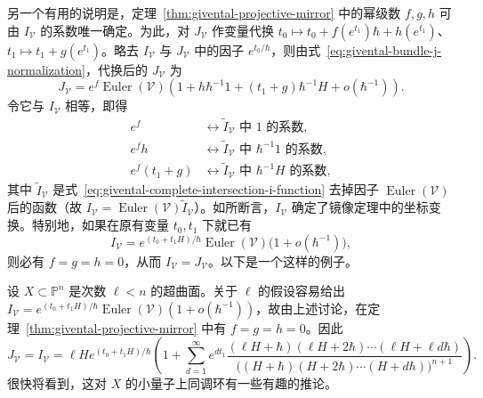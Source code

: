 另一个有用的说明是，定理~\ref{thm:givental-projective-mirror} 中的幂级数 $f,g,h$ 可由 $I_{\mathcal V}$ 的系数唯一确定。为此，对 $J_{\mathcal V}$ 作变量代换 $t_0\mapsto t_0+f(e^{t_1})\hbar+h(e^{t_1})$、$t_1\mapsto t_1+g(e^{t_1})$。略去 $I_{\mathcal V}$ 与 $J_{\mathcal V}$ 中的因子 $e^{t_0/\hbar}$，则由式~\eqref{eq:givental-bundle-j-normalization}，代换后的 $J_{\mathcal V}$ 为
\[
J_{\mathcal V}=e^f\operatorname{Euler}(\mathcal V)
\left(1+h\hbar^{-1}1+(t_1+g)\hbar^{-1}H+o(\hbar^{-1})\right).
\]
令它与 $I_{\mathcal V}$ 相等，即得
\begin{equation}\label{eq:givental-mirror-variable-coefficients}
\begin{aligned}
e^f&\longleftrightarrow\widetilde I_{\mathcal V}\text{ 中 }1\text{ 的系数},\\
e^fh&\longleftrightarrow\widetilde I_{\mathcal V}\text{ 中 }\hbar^{-1}1\text{ 的系数},\\
e^f(t_1+g)&\longleftrightarrow\widetilde I_{\mathcal V}\text{ 中 }\hbar^{-1}H\text{ 的系数},
\end{aligned}
\end{equation}
其中 $\widetilde I_{\mathcal V}$ 是式~\eqref{eq:givental-complete-intersection-i-function} 去掉因子 $\operatorname{Euler}(\mathcal V)$ 后的函数（故 $I_{\mathcal V}=\operatorname{Euler}(\mathcal V)\widetilde I_{\mathcal V}$）。如所断言，$I_{\mathcal V}$ 确定了镜像定理中的坐标变换。特别地，如果在原有变量 $t_0,t_1$ 下就已有
\[
I_{\mathcal V}=e^{(t_0+t_1H)/\hbar}\operatorname{Euler}(\mathcal V)
\bigl(1+o(\hbar^{-1})\bigr),
\]
则必有 $f=g=h=0$，从而 $I_{\mathcal V}=J_{\mathcal V}$。以下是一个这样的例子。
\begin{example}\label{ex:fano-hypersurface-i-j-equality}
设 $X\subset\mathbb P^n$ 是次数 $\ell<n$ 的超曲面。关于 $\ell$ 的假设容易给出 $I_{\mathcal V}=e^{(t_0+t_1H)/\hbar}\operatorname{Euler}(\mathcal V)(1+o(\hbar^{-1}))$，故由上述讨论，在定理~\ref{thm:givental-projective-mirror} 中有 $f=g=h=0$。因此
\[
J_{\mathcal V}=I_{\mathcal V}=\ell H e^{(t_0+t_1H)/\hbar}
\left(1+\sum_{d=1}^{\infty}e^{dt_1}
\frac{(\ell H+\hbar)(\ell H+2\hbar)\cdots(\ell H+\ell d\hbar)}
{\bigl((H+\hbar)(H+2\hbar)\cdots(H+d\hbar)\bigr)^{n+1}}\right).
\]
很快将看到，这对 $X$ 的小量子上同调环有一些有趣的推论。
\end{example}

